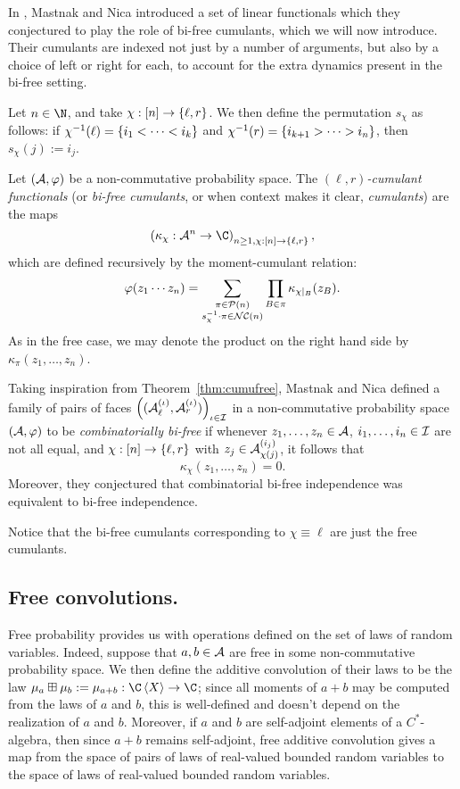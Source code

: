 In \cite{mastnak2015double}, Mastnak and Nica introduced a set of linear functionals which they conjectured to play the role of bi-free cumulants, which we will now introduce.
Their cumulants are indexed not just by a number of arguments, but also by a choice of left or right for each, to account for the extra dynamics present in the bi-free setting.

Let $n \in \N$, and take $\chi: [n] \to \left\{\ell, r\right\}$.
We then define the permutation $s_\chi$ as follows: if $\chi^{-1}(\ell) = \left\{i_1 < \cdots < i_k\right\}$ and $\chi^{-1}(r) = \left\{i_{k+1} > \cdots > i_n\right\}$, then $s_\chi(j) := i_j$.

\begin{definition}
	Let $(\mathcal{A}, \varphi)$ be a non-commutative probability space.
	The \emph{$(\ell, r)$-cumulant functionals} (or \emph{bi-free cumulants}, or when context makes it clear, \emph{cumulants}) are the maps
	$$\paren{\kappa_\chi : \A^{n} \to \C}_{n\geq1, \chi:[n]\to\slr},$$
	which are defined recursively by the moment-cumulant relation:
	$$\varphi(z_1\cdots z_n) = \sum_{\substack{\pi\in\mathcal{P}(n)\\s_\chi^{-1}\cdot\pi \in \mathcal{NC}(n)}} \prod_{B\in\pi}\kappa_{\chi|_B}(z_B).$$
	As in the free case, we may denote the product on the right hand side by $\kappa_\pi(z_1, \ldots, z_n)$.
\end{definition}

	Taking inspiration from Theorem~\ref{thm:cumufree}, Mastnak and Nica defined a family of pairs of faces $\left((\mathcal{A}_\ell^{(\iota)}, \mathcal{A}_r^{(\iota)})\right)_{\iota\in\mathcal{I}}$ in a non-commutative probability space $(\mathcal{A}, \varphi)$ to be \emph{combinatorially bi-free} if whenever $z_1, \ldots, z_n \in \mathcal{A}$, $i_1, \ldots, i_n \in \mathcal{I}$ are not all equal, and $\chi : [n] \to \left\{\ell, r\right\}$ with $z_j \in \mathcal{A}^{(i_j)}_{\chi(j)}$, it follows that
	$$\kappa_\chi(z_1, \ldots, z_n) = 0.$$
	Moreover, they conjectured that combinatorial bi-free independence was equivalent to bi-free independence.

	Notice that the bi-free cumulants corresponding to $\chi \equiv \ell$ are just the free cumulants.

\subsection{Free convolutions.}
Free probability provides us with operations defined on the set of laws of random variables.
Indeed, suppose that $a, b \in \mathcal{A}$ are free in some non-commutative probability space.
We then define the additive convolution of their laws to be the law $\mu_a\boxplus\mu_b := \mu_{a+b} : \C\ang{X} \to \C$; since all moments of $a+b$ may be computed from the laws of $a$ and $b$, this is well-defined and doesn't depend on the realization of $a$ and $b$.
Moreover, if $a$ and $b$ are self-adjoint elements of a $C^*$-algebra, then since $a+b$ remains self-adjoint, free additive convolution gives a map from the space of pairs of laws of real-valued bounded random variables to the space of laws of real-valued bounded random variables.

